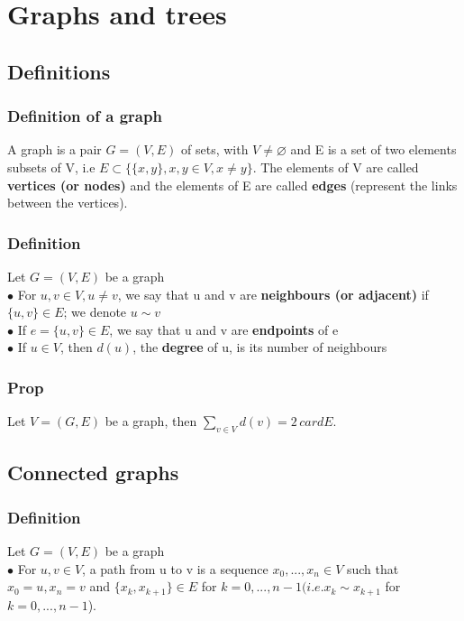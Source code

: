 \section{Graphs and trees}
        \subsection{Definitions}
            \subsubsection{Definition of a graph}
                A graph is a pair $G=(V,E)$ of sets, with $V\neq\varnothing$ and E is a set of two elements subsets of V, i.e $E \subset \{\{x,y\}, x,y\in V, x\neq y\}$. The elements of V are called \textbf{vertices (or nodes)} and the elements of E are called \textbf{edges} (represent the links between the vertices).

            \subsubsection{Definition}
                Let $G=(V,E)$ be a graph \\
                $\bullet$ For $u,v\in V, u\neq v$, we say that u and v are \textbf{neighbours (or adjacent)} if $\{u, v\}\in E$; we denote $u\sim v$ \\
                $\bullet$ If $e=\{u,v\}\in E$, we say that u and v are \textbf{endpoints} of e\\
                $\bullet$ If $u \in V$, then $d(u)$, the \textbf{degree} of u, is its number of neighbours

            \subsubsection{Prop}
                Let $V=(G,E)$ be a graph, then $\displaystyle\sum_{v\in V}d(v)=2\,card E$.

        \subsection{Connected graphs}
            \subsubsection{Definition}
                Let $G=(V,E)$ be a graph \\
                $\bullet$ For $u,v\in V$, a path from u to v is a sequence $x_0,...,x_n\in V$ such that $x_0=u,x_n=v$ and $\{x_k,x_{k+1}\}\in E$ for $k=0,...,n-1 (i.e. x_k\sim x_{k+1}$ for $k=0,...,n-1$).

